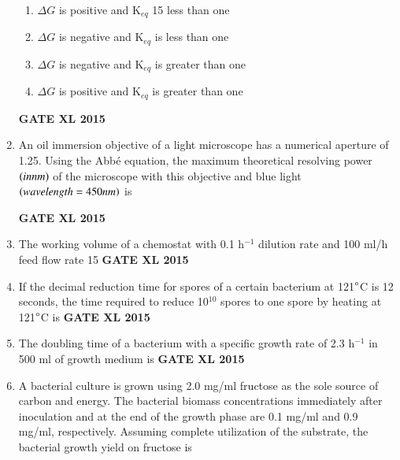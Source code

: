 \documentclass[journal,12pt,onecolumn]{IEEEtran}
\begin{document}
\begin{enumerate}
\begin{enumerate}
            \item $\Delta G$ is positive and K$_{eq}$ 15 less than one
	    \item $\Delta G$ is negative and K$_{eq}$ is less than one
	    \item $\Delta G$ is negative and K$_{eq}$ is greater than one
            \item $\Delta G$ is positive and K$_{eq}$ is greater than one
    \end{enumerate}
\hfill{\textbf{GATE XL 2015}}
\item An oil immersion objective of a light microscope has a numerical aperture of 1.25. Using the Abbé equation, the maximum theoretical resolving power $\left(in nm\right)$ of the microscope with this objective and blue light $\left(wavelength=450 nm\right)$ is

\hfill{\textbf{GATE XL 2015}}
\item The working volume  of a chemostat with 0.1 h$^{-1}$ dilution rate and 100 ml/h feed flow rate 15
\hfill{\textbf{GATE XL 2015}}
\item If the decimal reduction time for spores of a certain bacterium at 121$\degree$C is 12 seconds, the time required  to reduce 10$^{10}$ spores to one spore by heating at 121$\degree$C is
\hfill{\textbf{GATE XL 2015}}
\item	The doubling time  of a bacterium with a specific growth rate of 2.3 h$^{-1}$ in 500 ml of growth medium is
\hfill{\textbf{GATE XL 2015}}
\item
A bacterial culture is grown using 2.0 mg/ml fructose as the sole source of carbon and energy. The bacterial biomass concentrations immediately after inoculation and at the end of the growth phase are 0.1 mg/ml and 0.9 mg/ml, respectively. Assuming complete utilization of the substrate, the bacterial growth yield  on fructose is 
        

\end{enumerate}
\end{document}
